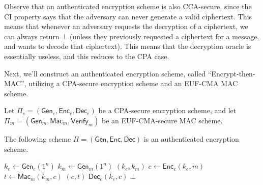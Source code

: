 Observe that an authenticated encryption scheme is also CCA-secure, since the CI property says that the adversary can never generate a valid ciphertext. This means that whenever an adversary requests the decryption of a ciphertext, we can always return $\bot$ (unless they previously requested a ciphertext for a message, and wants to decode that ciphertext). This means that the decryption oracle is essentially useless, and this reduces to the CPA case.

Next, we'll construct an authenticated encryption scheme, called ``Encrypt-then-MAC'', utilizing a CPA-secure encryption scheme and an EUF-CMA MAC scheme.

\begin{claim}
    Let $\Pi_e = (\mathsf{Gen}_e, \mathsf{Enc}_e, \mathsf{Dec}_e)$ be a CPA-secure encryption scheme, and let $\Pi_m = (\mathsf{Gen}_m, \mathsf{Mac}_m, \mathsf{Verify}_m)$ be an EUF-CMA-secure MAC scheme.

    The following scheme $\Pi = (\mathsf{Gen}, \mathsf{Enc}, \mathsf{Dec})$ is an authenticated encryption scheme.

    \begin{algorithmic}[1]
            \State $k_e \gets \mathsf{Gen}_e(1^n)$
            \State $k_m \gets \mathsf{Gen}_m(1^n)$
            \State \Return $(k_e, k_m)$
        \EndFunction
        \Statex
            \State $c \gets \mathsf{Enc}_e(k_e, m)$
            \State $t \gets \mathsf{Mac}_m(k_m, c)$
            \State \Return $(c, t)$
        \EndFunction
        \Statex
                \State \Return $\mathsf{Dec}_e(k_e, c)$
            \Else
                \State \Return $\bot$
            \EndIf 
        \EndFunction
    \end{algorithmic}
\end{claim}

